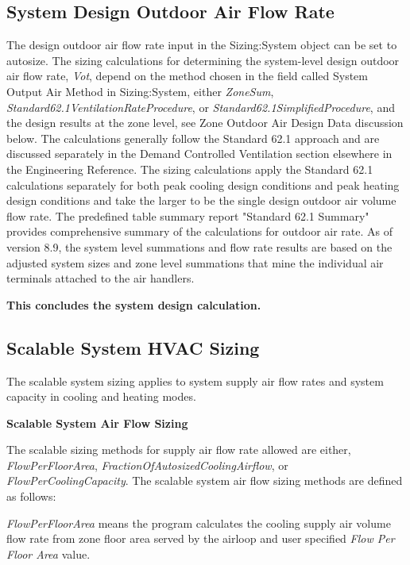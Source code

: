 \subsection{System Design Outdoor Air Flow Rate}\label{Design-Outdoor-Air-Flow-Rate}

The design outdoor air flow rate input in the Sizing:System object can be set to autosize. The sizing calculations for determining the system-level design outdoor air flow rate, \emph{Vot}, depend on the method chosen in the field called System Output Air Method in Sizing:System, either \emph{ZoneSum}, \emph{Standard62.1VentilationRateProcedure}, or \emph{Standard62.1SimplifiedProcedure}, and the design results at the zone level, see Zone Outdoor Air Design Data discussion below. The calculations generally follow the Standard 62.1 approach and are discussed separately in the Demand Controlled Ventilation section elsewhere in the Engineering Reference. The sizing calculations apply the Standard 62.1 calculations separately for both peak cooling design conditions and peak heating design conditions and take the larger to be the single design outdoor air volume flow rate. The predefined table summary report "Standard 62.1 Summary" provides comprehensive summary of the calculations for outdoor air rate.  As of version 8.9, the system level summations and flow rate results are based on the adjusted system sizes and zone level summations that mine the individual air terminals attached to the air handlers.



\textbf{This concludes the system design calculation.}

\subsection{Scalable System HVAC Sizing}\label{scalable-system-HVAC-sizing}

The scalable system sizing applies to system supply air flow rates and system capacity in cooling and heating modes.

\textbf{Scalable System Air Flow Sizing}

The scalable sizing methods for supply air flow rate allowed are either, \emph{FlowPerFloorArea}, \emph{FractionOfAutosizedCoolingAirflow}, or \emph{FlowPerCoolingCapacity}. The scalable system air flow sizing methods are defined as follows:

\emph{FlowPerFloorArea} means the program calculates the cooling supply air volume flow rate from zone floor area served by the airloop and user specified \emph{Flow Per Floor Area} value.


